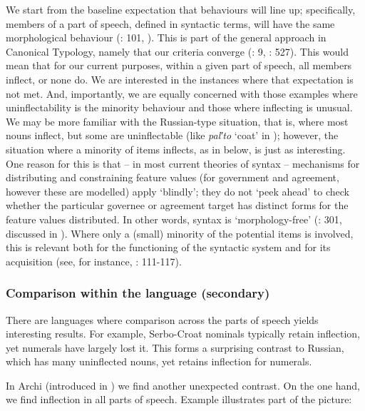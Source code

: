 \documentclass[output=paper]{langscibook}
\begin{document}
We start from the baseline expectation that behaviours will line up; specifically, members of a part of speech, defined in syntactic terms, will have the same morphological behaviour (\citealt{Spencer2005}: 101, \citealt{Corbett2013}). This is part of the general approach in Canonical Typology, namely that our criteria converge (\citealt{BrownChumakina2013}: 9, \citealt{CorbettFedden2016}: 527). This would mean that for our current purposes, within a given part of speech, all members inflect, or none do. We are interested in the instances where that expectation is not met. And, importantly, we are equally concerned with those examples where uninflectability is the minority behaviour and those where inflecting is unusual. We may be more familiar with the Russian-type situation, that is, where most nouns inflect, but some are uninflectable (like \textit{pal′to} ‘coat’ in ); however, the situation where a minority of items inflects, as in  below, is just as interesting. One reason for this is that – in most current theories of syntax – mechanisms for distributing and constraining feature values (for government and agreement, however these are modelled) apply ‘blindly’; they do not ‘peek ahead’ to check whether the particular governee or agreement target has distinct forms for the feature values distributed. In other words, syntax is ‘morphology-free’ (\citealt{Zwicky1996}: 301, discussed in \citealt{Corbett2009}). Where only a (small) minority of the potential items is involved, this is relevant both for the functioning of the syntactic system and for its acquisition (see, for instance, \citealt{ChumakinaBond2016}: 111-117). 

\subsubsection{\textbf{Comparison} \textbf{within} \textbf{the} \textbf{language} \textbf{(secondary)} }

There are languages where comparison across the parts of speech yields interesting results. For example, Serbo-Croat nominals typically retain inflection, yet numerals have largely lost it. This forms a surprising contrast to Russian, which has many uninflected nouns, yet retains inflection for numerals. 

In Archi (introduced in ) we find another unexpected contrast. On the one hand, we find inflection in all parts of speech. Example  illustrates part of the picture:
\end{document}
